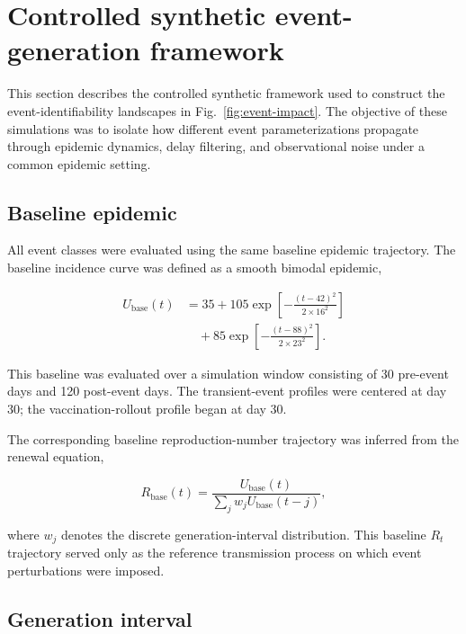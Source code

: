 \renewcommand{\thesection}{S\arabic{section}}
\setcounter{section}{3}
\section{Controlled synthetic event-generation framework}
\label{sec:Appendix_S4}

This section describes the controlled synthetic framework used to construct the event-identifiability landscapes in Fig.~\ref{fig:event-impact}. The objective of these simulations was to isolate how different event parameterizations propagate through epidemic dynamics, delay filtering, and observational noise under a common epidemic setting.

\subsection{Baseline epidemic}

All event classes were evaluated using the same baseline epidemic trajectory. The baseline incidence curve was defined as a smooth bimodal epidemic,

\begin{equation}
\begin{aligned}
U_{\mathrm{base}}(t)
&=
35
+
105
\exp\!\left[
-\frac{(t-42)^2}{2\times16^2}
\right]\\
&\quad
+
85
\exp\!\left[
-\frac{(t-88)^2}{2\times23^2}
\right].
\end{aligned}
\end{equation}

This baseline was evaluated over a simulation window consisting of 30 pre-event days and 120 post-event days. The transient-event profiles were centered at day 30; the vaccination-rollout profile began at day 30.

The corresponding baseline reproduction-number trajectory was inferred from the renewal equation,

\begin{equation}
R_{\mathrm{base}}(t)
=
\frac{U_{\mathrm{base}}(t)}
{\sum_j w_j U_{\mathrm{base}}(t-j)},
\end{equation}

where \(w_j\) denotes the discrete generation-interval distribution. This baseline \(R_t\) trajectory served only as the reference transmission process on which event perturbations were imposed.



\subsection{Generation interval}

